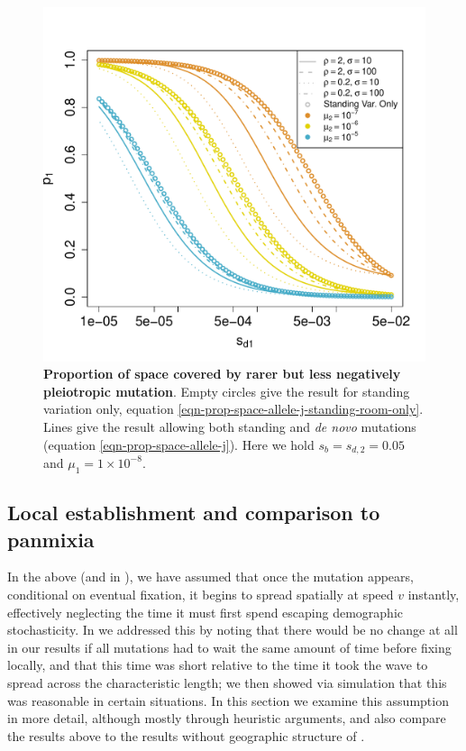 \documentclass{article}
\begin{document}

\begin{figure}[ht]
\begin{center}
  \includegraphics[width=1.0\textwidth]{pleiotropy_calc}
\caption{ %
{\bf Proportion of space covered by rarer but less negatively pleiotropic
  mutation}. Empty circles give the result for standing variation only,
  equation \eqref{eqn-prop-space-allele-j-standing-room-only}. Lines give
  the result allowing both standing and \textit{de novo} mutations (equation \eqref{eqn-prop-space-allele-j}).
  Here we hold $s_b=s_{d,2}=0.05$ and $\mu_1=1 \times 10^{-8}$.
  }   \label{fig:pleiotropy_calc}
\end{center}
\end{figure}


\subsection{Local establishment and comparison to panmixia}

In the above (and in \citet{ralphcoop2010}), we have assumed that once the mutation appears,
conditional on eventual fixation, it begins to spread spatially at speed $v$ instantly,
effectively neglecting the time it must first spend escaping demographic stochasticity.
In \citet{ralphcoop2010} we addressed this by noting that there would be no change at all in our results 
if all mutations had to wait the same amount of time before fixing locally,
and that this time was short relative to the time it took the wave to spread across the characteristic length;
we then showed via simulation that this was reasonable in certain situations.
In this section we examine this assumption in more detail, although mostly through heuristic arguments,
and also compare the results above to the results without geographic structure of \citet{softsweepsII}.
\end{document}
